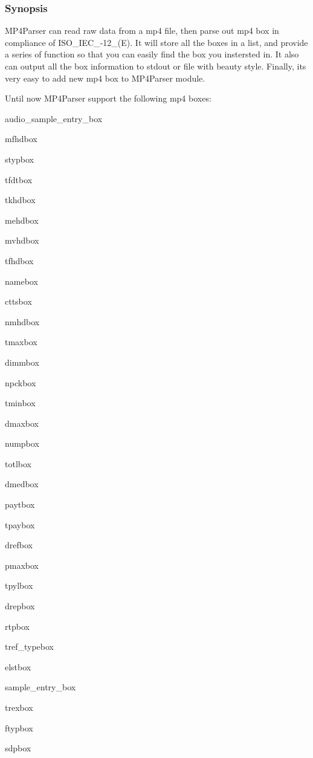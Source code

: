 \subsubsection*{Synopsis}

M\+P4\+Parser can read raw data from a mp4 file, then parse out mp4 box in compliance of I\+S\+O\+\_\+\+I\+E\+C\+\_-\/12\+\_(E). It will store all the boxes in a list, and provide a series of function so that you can easily find the box you instersted in. It also can output all the box information to stdout or file with beauty style. Finally, it\textquotesingle{}s very easy to add new mp4 box to M\+P4\+Parser module.

Until now M\+P4\+Parser support the following mp4 boxes\+:
\begin{DoxyItemize}
\item audio\+\_\+sample\+\_\+entry\+\_\+box
\item mfhdbox
\item stypbox
\item tfdtbox
\item tkhdbox
\item mehdbox
\item mvhdbox
\item tfhdbox
\item namebox
\item cttsbox
\item nmhdbox
\item tmaxbox
\item dimmbox
\item npckbox
\item tminbox
\item dmaxbox
\item numpbox
\item totlbox
\item dmedbox
\item paytbox
\item tpaybox
\item drefbox
\item pmaxbox
\item tpylbox
\item drepbox
\item rtpbox
\item tref\+\_\+typebox
\item elstbox
\item sample\+\_\+entry\+\_\+box
\item trexbox
\item ftypbox
\item sdpbox

\end{DoxyItemize}
